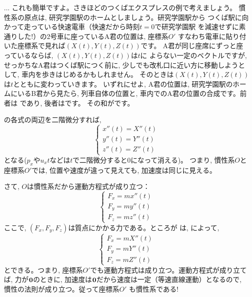 \begin{faq}{\small{}
... これも簡単ですよ。さきほどのつくばエクスプレスの例で考えましょう。
慣性系の原点は, 研究学園駅のホームとしましょう。研究学園駅から
つくば駅に向かって走っている快速電車（快速だから時刻$t=0$で研究学園駅
を減速せずに素通りした!）の2号車に座っているA君の位置は, 座標系$O'$
すなわち電車に貼り付いた座標系で見れば$(X(t), Y(t), Z(t))$です。
A君が同じ座席にずっと座っているならば, $(X(t), Y(t), Z(t))$は$t$に
よらない一定のベクトルですが, せっかちなA君はつくば駅につく前に, 
少しでも改札口に近い方に移動しようとして, 車内を歩きはじめるかもしれません。
そのときは$(X(t), Y(t), Z(t))$は$t$とともに変わっていきます。
いずれにせよ, A君の位置は, 研究学園駅のホームにいるB君から見たら, 
列車自体の位置と, 車内でのA君の位置の合成です。前者は
であり, 後者はです。
その和がです。}\end{faq}

の各式の両辺を二階微分すれば, 
\begin{equation}\begin{cases}
x''(t)=X''(t)\\
y''(t)=Y''(t)\\
z''(t)=Z''(t)
\end{cases}\label{eq:origin_move4}\end{equation}
となる($p_x$や$u_xt$などは$t$で二階微分すると0になって消える)。
つまり, 慣性系$O$と座標系$O'$では, 位置や速度が違って見えても, 
加速度は同じに見える。

さて, $O$は慣性系だから運動方程式が成り立つ：
\begin{equation}\begin{cases}
F_x=mx''(t)\\
F_y=my''(t)\\
F_z=mz''(t)
\end{cases}\label{eq:origin_move5}\end{equation}
ここで, $(F_x, F_y, F_z)$は質点にかかる力である。ところが
は, によって, 
\begin{equation}\begin{cases}
F_x=mX''(t)\\
F_y=mY''(t)\\
F_z=mZ''(t)
\end{cases}\end{equation}
とできる。つまり, 座標系$O'$でも運動方程式は成り立つ。運動方程式が成り立てば, 力が${\bf 0}$のときに, 
加速度は${\bf 0}$だから速度は一定（等速直線運動）となるので, 慣性の法則が成り立つ。従って座標系$O'$
も慣性系である!\\

